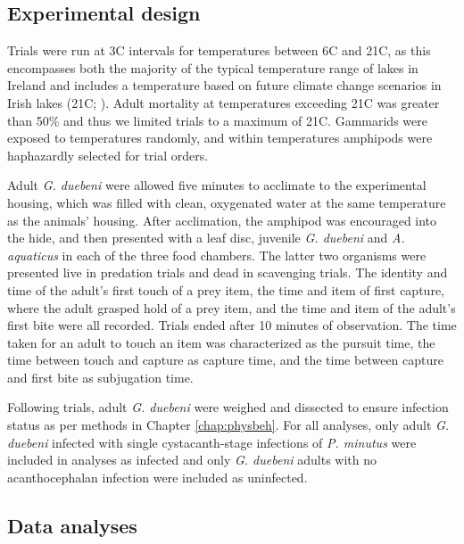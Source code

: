 \subsection{Experimental design}

Trials were run at 3\degree C intervals for temperatures between 6\degree C and 21\degree C, as this encompasses both the majority of the typical temperature range of lakes in Ireland and includes a temperature based on future climate change scenarios in Irish lakes (21\degree C; \cite{ipcc2014}). Adult mortality at temperatures exceeding 21\degree C was greater than 50\% and thus we limited trials to a maximum of 21\degree C. Gammarids were exposed to temperatures randomly, and within temperatures amphipods were haphazardly selected for trial orders.

Adult \emph{G. duebeni} were allowed five minutes to acclimate to the experimental housing, which was filled with clean, oxygenated water at the same temperature as the animals' housing. After acclimation, the amphipod was encouraged into the hide, and then presented with a leaf disc, juvenile \emph{G. duebeni} and \emph{A. aquaticus} in each of the three food chambers. The latter two organisms were presented live in predation trials and dead in scavenging trials. The identity and time of the adult’s first touch of a prey item, the time and item of first capture, where the adult grasped hold of a prey item, and the time and item of the adult’s first bite were all recorded. Trials ended after 10 minutes of observation. The time taken for an adult to touch an item was characterized as the pursuit time, the time between touch and capture as capture time, and the time between capture and first bite as subjugation time. 

Following trials, adult \emph{G. duebeni} were weighed and dissected to ensure infection status as per methods in Chapter \ref{chap:physbeh}. For all analyses, only adult \emph{G. duebeni} infected with single cystacanth-stage infections of \emph{P. minutus} were included in analyses as infected and only \emph{G. duebeni} adults with no acanthocephalan infection were included as uninfected. 

\subsection{Data analyses}


